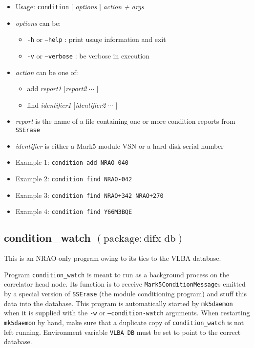 \begin{itemize}
\item[] Usage: {\tt condition} $[$ {\em options} $]$ {\em action + args}
\item[] {\em options} can be:
\begin{itemize}
\item[] {\tt -h} or {\tt --help} : print usage information and exit
\item[] {\tt -v} or {\tt --verbose} : be verbose in execution
\end{itemize}
\item[] {\em action} can be one of:
\begin{itemize}
\item[] add {\em report1} $[${\em report2} $\cdots$ $]$
\item[] find {\em identifier1} $[${\em identifier2} $\cdots$ $]$
\end{itemize}
\item[] {\em report} is the name of a file containing one or more condition reports from {\tt SSErase}
\item[] {\em identifier} is either a Mark5 module VSN or a hard disk serial number
\item[] Example 1: {\tt condition add NRAO-040}
\item[] Example 2: {\tt condition find NRAO-042}
\item[] Example 3: {\tt condition find NRAO+342 NRAO+270}
\item[] Example 4: {\tt condition find Y66M3BQE}
\end{itemize}








\subsection{condition\_watch {\small $\mathrm{(package: difx\_db)}$}}

This is an NRAO-only program owing to its ties to the VLBA database.

Program {\tt condition\_watch} is meant to run as a background process on the correlator head node.
Its function is to receive {\tt Mark5ConditionMessage}s emitted by a special version of {\tt SSErase} (the module conditioning program) and stuff this data into the database.
This program is automatically started by {\tt mk5daemon} when it is supplied with the {\tt -w} or {\tt --condition-watch} arguments.
When restarting {\tt mk5daemon} by hand, make sure that a duplicate copy of {\tt condition\_watch} is not left running.
Environment variable {\tt VLBA\_DB} must be set to point to the correct database.

